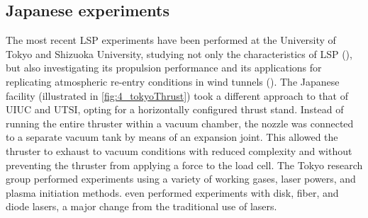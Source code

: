         \subsection{Japanese experiments}
            The most recent LSP experiments have been performed at the University of Tokyo and Shizuoka University, studying not only the characteristics of LSP (\textcite{inoueOscillationPhenomenonLasersustained2004}), but also investigating its propulsion performance and its applications for replicating atmospheric re-entry conditions in wind tunnels (\textcite{matsuiAtomicOxygenFlowGenerationLaserDriven2014}). The Japanese facility (illustrated in \autoref{fig:4_tokyoThrust}) took a different approach to that of UIUC and UTSI, opting for a horizontally configured thrust stand. Instead of running the entire thruster within a vacuum chamber, the nozzle was connected to a separate vacuum tank by means of an expansion joint. This  allowed the thruster to exhaust to vacuum conditions with reduced complexity and without preventing the thruster from applying a force to the load cell. The Tokyo research group performed experiments using a variety of working gases, laser powers, and plasma initiation methods. \textcite{matsuiGeneratingConditionsArgon2019} even performed experiments with disk, fiber, and diode lasers, a major change from the traditional use of  lasers. 

